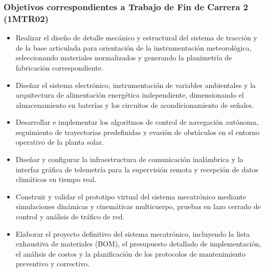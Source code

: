 \documentclass[../../General.tex]{subfiles}
\begin{document}
\subsubsection{Objetivos correspondientes a Trabajo de Fin de Carrera 2 (1MTR02)}
\begin{itemize}
    \item Realizar el diseño de detalle mecánico y estructural del sistema de tracción y de la base articulada para orientación de la instrumentación meteorológica, seleccionando materiales normalizados y generando la planimetría de fabricación correspondiente.
    \item Diseñar el sistema electrónico, instrumentación de variables ambientales y la arquitectura de alimentación energética independiente, dimensionando el almacenamiento en baterías y los circuitos de acondicionamiento de señales.
    \item Desarrollar e implementar los algoritmos de control de navegación autónoma, seguimiento de trayectorias predefinidas y evasión de obstáculos en el entorno operativo de la planta solar.
    \item Diseñar y configurar la infraestructura de comunicación inalámbrica y la interfaz gráfica de telemetría para la supervisión remota y recepción de datos climáticos en tiempo real.
    \item Construir y validar el prototipo virtual del sistema mecatrónico mediante simulaciones dinámicas y cinemáticas multicuerpo, pruebas en lazo cerrado de control y análisis de tráfico de red.
    \item Elaborar el proyecto definitivo del sistema mecatrónico, incluyendo la lista exhaustiva de materiales (BOM), el presupuesto detallado de implementación, el análisis de costos y la planificación de los protocolos de mantenimiento preventivo y correctivo.
\end{itemize}
\end{document}
